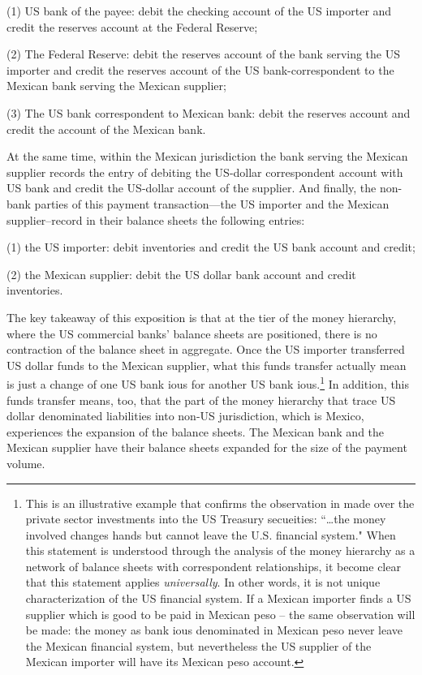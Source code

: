(1) US bank of the payee: debit the checking account of the US importer
    and credit the reserves account at the Federal Reserve;

(2) The Federal Reserve: debit the reserves account of the bank serving
    the US importer and credit the reserves account of the US
    bank-correspondent to the Mexican bank serving the Mexican supplier;

(3) The US bank correspondent to Mexican bank: debit the reserves
    account and credit the account of the Mexican bank.

At the same time, within the Mexican jurisdiction the bank serving the
Mexican supplier records the entry of debiting the US-dollar
correspondent account with US bank and credit the US-dollar account of
the supplier. And finally, the non-bank parties of this payment
transaction---the US importer and the Mexican supplier--record in their
balance sheets the following entries:

(1) the US importer: debit inventories and credit the US bank account
    and credit;

(2) the Mexican supplier: debit the US dollar bank account and credit
    inventories.

The key takeaway of this exposition is that at the tier of the money
hierarchy, where the US commercial banks' balance sheets are positioned,
there is no contraction of the balance sheet in aggregate. Once the US
importer transferred US dollar funds to the Mexican supplier, what this
funds transfer actually mean is just a change of one US bank \acp{iou} for
another US bank \acp{iou}.\footnote{This is an illustrative example that confirms 
the observation in
    \citep{newman} made over the private sector investments into the US
    Treasury secueities: ``\dots the money involved changes hands but cannot
    leave the U.S. financial system." When this statement is understood
    through the analysis of the money hierarchy as a network of balance
    sheets with correspondent relationships, it become clear that this
    statement applies \textit{universally}. In other words, it is not unique
    characterization of the US financial system. If a Mexican importer
    finds a US supplier which is good to be paid in Mexican peso -- the
    same observation will be made: the money as bank \acp{iou} denominated in
    Mexican peso never leave the Mexican financial system, but
    nevertheless the US supplier of the Mexican importer will have its
    Mexican peso account.} In addition, this funds transfer means, too,
that the part of the money hierarchy that trace US dollar denominated
liabilities into non-US jurisdiction, which is Mexico, experiences the
expansion of the balance sheets. The Mexican bank and the Mexican
supplier have their balance sheets expanded for the size of the payment
volume.


